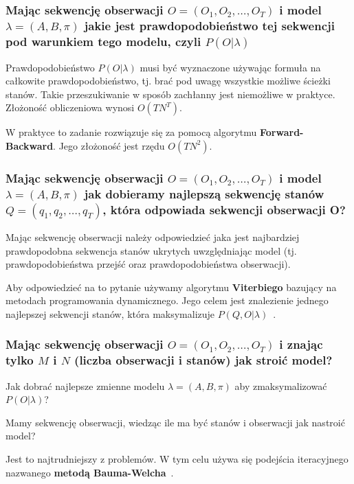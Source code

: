 \documentclass[wi]{zut}
\begin{document}
\subsubsection{Mając sekwencję obserwacji $O = (O_1, O_2, \ldots, O_T)$ i model $\lambda = (A, B, \pi)$ jakie jest prawdopodobieństwo tej sekwencji pod warunkiem tego modelu, czyli $P(O|\lambda)$}

Prawdopodobieństwo $P(O|\lambda)$ musi być wyznaczone używając formuła na całkowite prawdopodobieństwo, tj. brać pod uwagę wszystkie możliwe ścieżki stanów. Takie przeszukiwanie w sposób zachłanny jest niemożliwe w praktyce. Złożoność obliczeniowa wynosi $O(TN^T)$\cite{Pietrzykowski2020}. 

W praktyce to zadanie rozwiązuje się za pomocą algorytmu \textbf{Forward-Backward}. Jego złożoność jest rzędu $O(TN^2)$\cite{Pietrzykowski2020}.

\subsubsection{Mając sekwencję obserwacji $O = (O_1, O_2, \ldots, O_T)$ i model $\lambda = (A, B, \pi)$ jak dobieramy najlepszą sekwencję stanów $Q = (q_1, q_2, \ldots, q_T)$, która odpowiada sekwencji obserwacji O?}

Mając sekwencję obserwacji należy odpowiedzieć jaka jest najbardziej prawdopodobna sekwencja stanów ukrytych uwzględniając model (tj. prawdopodobieństwa przejść oraz prawdopodobieństwa obserwacji).

Aby odpowiedzieć na to pytanie używamy algorytmu \textbf{Viterbiego} bazujący na metodach programowania dynamicznego. Jego celem jest znalezienie jednego najlepszej sekwencji stanów, która maksymalizuje $P(Q, O|\lambda)$~\cite{Pietrzykowski2020}.

\subsubsection{Mając sekwencję obserwacji $O = (O_1, O_2, \ldots, O_T)$ i znając tylko $M$ i $N$ (liczba obserwacji i stanów) jak stroić model?}

Jak dobrać najlepsze zmienne modelu $\lambda = (A, B, \pi)$ aby zmaksymalizować $P(O|\lambda)$?

Mamy sekwencję obserwacji, wiedząc ile ma być stanów i obserwacji jak nastroić model?

Jest to najtrudniejszy z problemów. W tym celu używa się podejścia iteracyjnego nazwanego \textbf{metodą Bauma-Welcha}~\cite{Pietrzykowski2020}.
\end{document}
